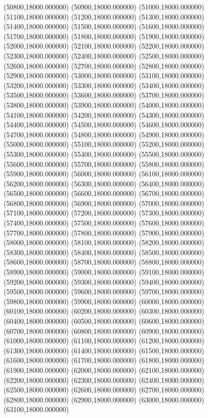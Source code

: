 (50800,18000.000000)
(50900,18000.000000)
(51000,18000.000000)
(51100,18000.000000)
(51200,18000.000000)
(51300,18000.000000)
(51400,18000.000000)
(51500,18000.000000)
(51600,18000.000000)
(51700,18000.000000)
(51800,18000.000000)
(51900,18000.000000)
(52000,18000.000000)
(52100,18000.000000)
(52200,18000.000000)
(52300,18000.000000)
(52400,18000.000000)
(52500,18000.000000)
(52600,18000.000000)
(52700,18000.000000)
(52800,18000.000000)
(52900,18000.000000)
(53000,18000.000000)
(53100,18000.000000)
(53200,18000.000000)
(53300,18000.000000)
(53400,18000.000000)
(53500,18000.000000)
(53600,18000.000000)
(53700,18000.000000)
(53800,18000.000000)
(53900,18000.000000)
(54000,18000.000000)
(54100,18000.000000)
(54200,18000.000000)
(54300,18000.000000)
(54400,18000.000000)
(54500,18000.000000)
(54600,18000.000000)
(54700,18000.000000)
(54800,18000.000000)
(54900,18000.000000)
(55000,18000.000000)
(55100,18000.000000)
(55200,18000.000000)
(55300,18000.000000)
(55400,18000.000000)
(55500,18000.000000)
(55600,18000.000000)
(55700,18000.000000)
(55800,18000.000000)
(55900,18000.000000)
(56000,18000.000000)
(56100,18000.000000)
(56200,18000.000000)
(56300,18000.000000)
(56400,18000.000000)
(56500,18000.000000)
(56600,18000.000000)
(56700,18000.000000)
(56800,18000.000000)
(56900,18000.000000)
(57000,18000.000000)
(57100,18000.000000)
(57200,18000.000000)
(57300,18000.000000)
(57400,18000.000000)
(57500,18000.000000)
(57600,18000.000000)
(57700,18000.000000)
(57800,18000.000000)
(57900,18000.000000)
(58000,18000.000000)
(58100,18000.000000)
(58200,18000.000000)
(58300,18000.000000)
(58400,18000.000000)
(58500,18000.000000)
(58600,18000.000000)
(58700,18000.000000)
(58800,18000.000000)
(58900,18000.000000)
(59000,18000.000000)
(59100,18000.000000)
(59200,18000.000000)
(59300,18000.000000)
(59400,18000.000000)
(59500,18000.000000)
(59600,18000.000000)
(59700,18000.000000)
(59800,18000.000000)
(59900,18000.000000)
(60000,18000.000000)
(60100,18000.000000)
(60200,18000.000000)
(60300,18000.000000)
(60400,18000.000000)
(60500,18000.000000)
(60600,18000.000000)
(60700,18000.000000)
(60800,18000.000000)
(60900,18000.000000)
(61000,18000.000000)
(61100,18000.000000)
(61200,18000.000000)
(61300,18000.000000)
(61400,18000.000000)
(61500,18000.000000)
(61600,18000.000000)
(61700,18000.000000)
(61800,18000.000000)
(61900,18000.000000)
(62000,18000.000000)
(62100,18000.000000)
(62200,18000.000000)
(62300,18000.000000)
(62400,18000.000000)
(62500,18000.000000)
(62600,18000.000000)
(62700,18000.000000)
(62800,18000.000000)
(62900,18000.000000)
(63000,18000.000000)
(63100,18000.000000)
